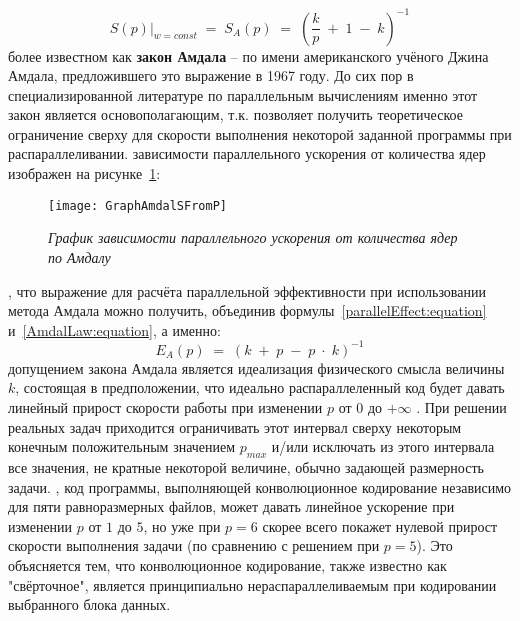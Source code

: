 {	\begin{equation}
		\label{AmdalLaw:equation}
		\left.S(p)\right|_{w=const}\;=\;S_A(p)\;=\;\left(\frac kp\;+\;1\;-\;k\right)^{-1}
	\end{equation}
	более известном как \textbf{закон Амдала} – по имени американского учёного Джина Амдала, предложившего это выражение в 1967 году. До сих пор в специализированной литературе по параллельным вычислениям именно этот закон является основополагающим, т.к. позволяет получить теоретическое ограничение сверху для скорости выполнения некоторой заданной программы при распараллеливании.
	 зависимости параллельного ускорения от количества ядер изображен на рисунке~\ref{GraphAmdalSFromP:image}:
	\begin{figure}[H]
		\texttt{[image: GraphAmdalSFromP]}
		\caption{\textit{График зависимости параллельного ускорения от количества ядер по Амдалу}}
		\label{GraphAmdalSFromP:image}
	\end{figure}
	, что выражение для расчёта параллельной эффективности при использовании метода Амдала можно получить, объединив формулы~\eqref{parallelEffect:equation} и~\eqref{AmdalLaw:equation}, а именно:
	\begin{equation}
		E_A(p)\;=\;\left(k\;+\;p\;-\;p\;\cdot\;k\right)^{-1}
	\end{equation}
	 допущением закона Амдала является идеализация физического смысла величины $k$, состоящая в предположении, что идеально распараллеленный код будет давать линейный прирост скорости работы при изменении $p$ от $0$ до $+\infty$ . При решении реальных задач приходится ограничивать этот интервал сверху некоторым конечным положительным значением $p_{max}$ и/или исключать из этого интервала все значения, не кратные некоторой величине, обычно задающей размерность задачи.
	, код программы, выполняющей конволюционное кодирование независимо для пяти равноразмерных файлов, может давать линейное ускорение при изменении $p$ от $1$ до $5$, но уже при $p=6$ скорее всего покажет нулевой прирост скорости выполнения задачи (по сравнению с решением при $p=5$). Это объясняется тем, что  конволюционное кодирование, также известно как "свёрточное", является принципиально нераспараллеливаемым при кодировании выбранного блока данных.
	\par
}